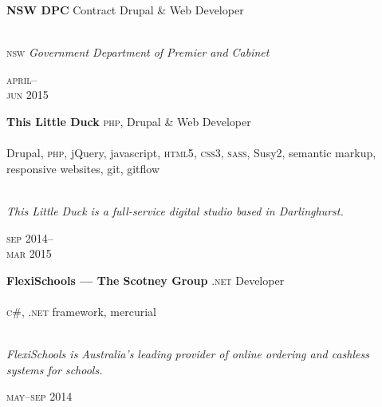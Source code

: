 \begin{minipage}[t]{0.70\textwidth}
\textbf{NSW DPC}\phantom{..} Contract Drupal \& Web Developer \\
\\
{\small
\textsc{nsw} \textit{Government Department of Premier and Cabinet}
\par}
\end{minipage}
\begin{minipage}[t]{0.30\textwidth}
{
\hfill \textsc{april}--\\ 
\hspace*{0pt} \hfill \textsc{jun} 2015
\par
}
\end{minipage}
\vspace{0.2in}

\begin{minipage}[t]{0.70\textwidth}
\textbf{This Little Duck}\phantom{..} \textsc{php}, Drupal \& Web Developer \\
\\
Drupal, \textsc{php}, jQuery, javascript, \textsc{html5}, 
\textsc{css3}, \textsc{sass}, Susy2, semantic markup, responsive websites,
git, gitflow
\\
\\
{\small
\textit{This Little Duck is a full-service digital studio based in Darlinghurst.}
\par}
\end{minipage}
\begin{minipage}[t]{0.30\textwidth}
{
\hfill \textsc{sep} 2014--\\ 
\hspace*{0pt} \hfill \textsc{mar} 2015
\par
}
\end{minipage}

\vspace{0.2in}

\begin{minipage}[t]{0.7\textwidth}
\textbf{FlexiSchools --- The Scotney Group}\phantom{..} \textsc{.net} Developer \\
\\
\textsc{c\#}, \textsc{.net} framework, mercurial
\\
\\
{\small
\textit{FlexiSchools is Australia’s leading provider of online ordering and cashless systems for schools.}
\par}
\end{minipage}
\begin{minipage}[t]{0.30\textwidth}
\hfill \textsc{may}--\textsc{sep} 2014\\
\end{minipage}

